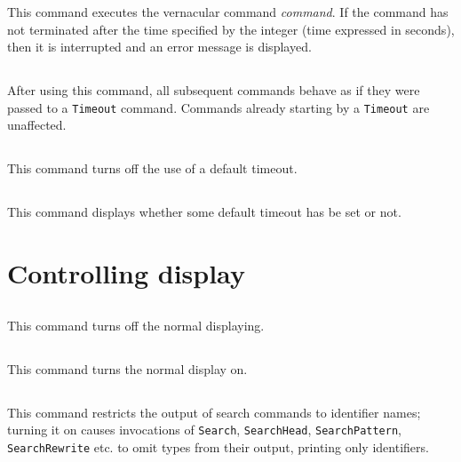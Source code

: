 This command executes the vernacular command \textrm{\textsl{command}}. If
the command has not terminated after the time specified by the integer
(time expressed in seconds), then it is interrupted and an error message
is displayed.

\subsection[\tt Set Default Timeout \textrm{\textsl{int}}.]{}

After using this command, all subsequent commands behave as if they
were passed to a {\tt Timeout} command. Commands already starting by
a {\tt Timeout} are unaffected.

\subsection[\tt Unset Default Timeout.]{}

This command turns off the use of a default timeout.

\subsection[\tt Test Default Timeout.]{}

This command displays whether some default timeout has be set or not.

\section{Controlling display}

\subsection[\tt Set Silent.]{}
This command turns off the normal displaying.

\subsection[\tt Unset Silent.]{}
This command turns the normal display on.

\subsection[\tt Set Search Output Name Only.]{
\label{Search-Output-Name-Only}
}
This command restricts the output of search commands to identifier names; turning it on causes invocations of {\tt Search}, {\tt SearchHead}, {\tt SearchPattern}, {\tt SearchRewrite} etc. to omit types from their output, printing only identifiers.

